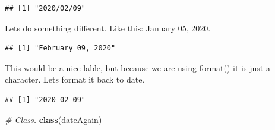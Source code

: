 \documentclass[]{book}
\newenvironment{Shaded}{\begin{snugshade}}{\end{snugshade}}
\newcommand{\CommentTok}[1]{\textcolor[rgb]{0.56,0.35,0.01}{\textit{#1}}}
\newcommand{\DataTypeTok}[1]{\textcolor[rgb]{0.13,0.29,0.53}{#1}}
\newcommand{\KeywordTok}[1]{\textcolor[rgb]{0.13,0.29,0.53}{\textbf{#1}}}
\newcommand{\NormalTok}[1]{#1}
\newcommand{\StringTok}[1]{\textcolor[rgb]{0.31,0.60,0.02}{#1}}
\begin{document}
\begin{Shaded}
\end{Shaded}

\begin{verbatim}
## [1] "2020/02/09"
\end{verbatim}

Lets do something different. Like this: January 05, 2020.

\begin{Shaded}
\end{Shaded}

\begin{verbatim}
## [1] "February 09, 2020"
\end{verbatim}

This would be a nice lable, but because we are using format() it is just a character. Lets format it back to date.

\begin{Shaded}
\end{Shaded}

\begin{verbatim}
## [1] "2020-02-09"
\end{verbatim}

\begin{Shaded}
\begin{Highlighting}[]
\CommentTok{# Class.}
\KeywordTok{class}\NormalTok{(dateAgain)}
\end{Highlighting}
\end{Shaded}
\end{document}
